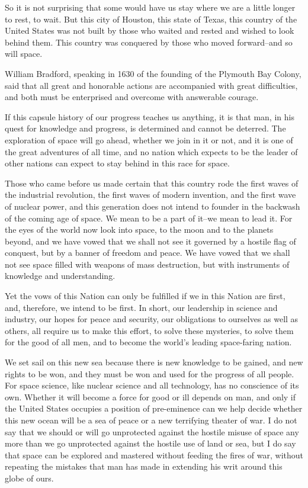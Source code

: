 \documentclass[a4paper]{amsbook}
\begin{document}
So it is not surprising that some would have us stay where we are a little longer to rest, to wait. But this city of Houston, this state of Texas, this country of the United States was not built by those who waited and rested and wished to look behind them. This country was conquered by those who moved forward–and so will space.

William Bradford, speaking in 1630 of the founding of the Plymouth Bay Colony, said that all great and honorable actions are accompanied with great difficulties, and both must be enterprised and overcome with answerable courage.

If this capsule history of our progress teaches us anything, it is that man, in his quest for knowledge and progress, is determined and cannot be deterred. The exploration of space will go ahead, whether we join in it or not, and it is one of the great adventures of all time, and no nation which expects to be the leader of other nations can expect to stay behind in this race for space.

Those who came before us made certain that this country rode the first waves of the industrial revolution, the first waves of modern invention, and the first wave of nuclear power, and this generation does not intend to founder in the backwash of the coming age of space. We mean to be a part of it–we mean to lead it. For the eyes of the world now look into space, to the moon and to the planets beyond, and we have vowed that we shall not see it governed by a hostile flag of conquest, but by a banner of freedom and peace. We have vowed that we shall not see space filled with weapons of mass destruction, but with instruments of knowledge and understanding.

Yet the vows of this Nation can only be fulfilled if we in this Nation are first, and, therefore, we intend to be first. In short, our leadership in science and industry, our hopes for peace and security, our obligations to ourselves as well as others, all require us to make this effort, to solve these mysteries, to solve them for the good of all men, and to become the world's leading space-faring nation.

We set sail on this new sea because there is new knowledge to be gained, and new rights to be won, and they must be won and used for the progress of all people. For space science, like nuclear science and all technology, has no conscience of its own. Whether it will become a force for good or ill depends on man, and only if the United States occupies a position of pre-eminence can we help decide whether this new ocean will be a sea of peace or a new terrifying theater of war. I do not say that we should or will go unprotected against the hostile misuse of space any more than we go unprotected against the hostile use of land or sea, but I do say that space can be explored and mastered without feeding the fires of war, without repeating the mistakes that man has made in extending his writ around this globe of ours.
\end{document}
